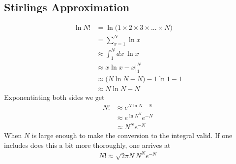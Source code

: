 \subsection{Stirlings Approximation}\label{stirling}
\begin{align}
\ln N! &= \ln \Big(1\times 2\times 3\times...\times N\Big)\\
&= \sum_{x=1}^N \ln x\\
&\approx \int_1^N dx~\ln x\\
&\approx x\ln x - x\Big|_1^N\\
&\approx \Big(N\ln N- N \Big) - 1\ln 1 - 1\\
&\approx N\ln N - N
\end{align}
Exponentiating both sides we get
\begin{align}
N! &\approx e^{N\ln N - N}\\
&\approx e^{\ln N^N}e^{-N}\\
&\approx N^Ne^{-N}
\end{align}
When $N$ is large enough to make the conversion to the integral valid. If one includes does this a bit more thoroughly, one arrives at
\begin{align}
	N! \approx \sqrt{2\pi N} N^Ne^{-N}
\end{align}


